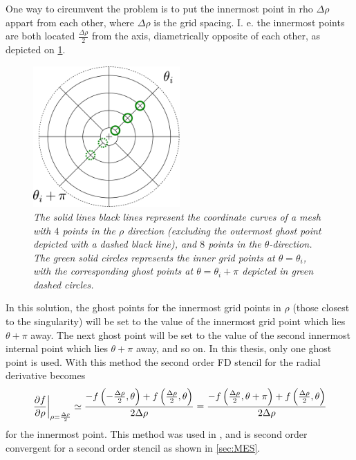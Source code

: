 One way to circumvent the problem is to put the innermost point in rho $\Delta \rho$ appart from each other, where $\Delta \rho$ is the grid spacing.
I. e. the innermost points are both located $\frac{\Delta \rho}{2}$ from the axis, diametrically opposite of each other, as depicted on \cref{fig:innerRho}.
%
\begin{figure}[htb]
    \centering
    \includegraphics[width=0.5\textwidth]{fig/innerGhost}
    \caption{\textit{
The solid lines black lines represent the coordinate curves of a mesh with $4$ points in the $\rho$ direction (excluding the outermost ghost point depicted with a dashed black line), and $8$ points in the $\theta$-direction.
The green solid circles represents the inner grid points at $\theta=\theta_i$, with the corresponding ghost points at $\theta=\theta_i + \pi$ depicted in green dashed circles.
    }}
    \label{fig:innerRho}
\end{figure}
%
In this solution, the ghost points for the innermost grid points in $\rho$ (those closest to the singularity) will be set to the value of the innermost grid point which lies $\theta + \pi$ away.
The next ghost point will be set to the value of the second innermost internal point which lies $\theta + \pi$ away, and so on.
In this thesis, only one ghost point is used.
With this method the second order FD stencil for the radial derivative becomes
%
\begin{align*}
    \left.\frac{\partial {f}}{\partial{\rho}}\right|_{\rho=\frac{\Delta \rho}{2}} \simeq
    \frac{-f\left(-\frac{\Delta \rho}{2}, \theta\right) + f\left(\frac{\Delta \rho}{2}, \theta\right)}{2\Delta \rho}
    =
    \frac{-f\left(\frac{\Delta \rho}{2}, \theta+\pi\right) + f\left(\frac{\Delta \rho}{2}, \theta\right)}{2\Delta \rho}
\end{align*}
%
for the innermost point.
This method was used in \cite{Naulin2008}, and is second order convergent for a second order stencil as shown in \cref{sec:MES}.

